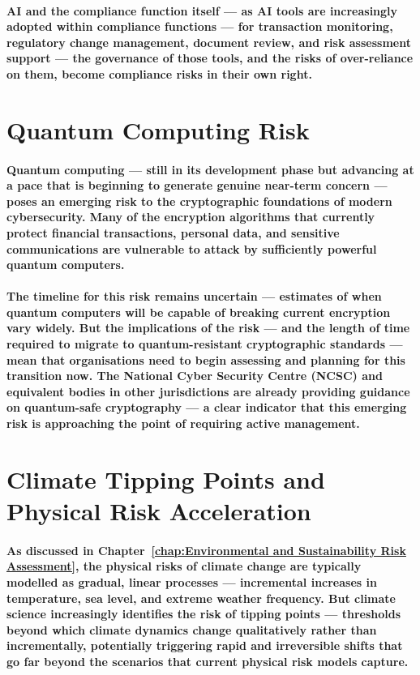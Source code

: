 \paragraph{\textbf{AI and the compliance function itself} — as AI tools are increasingly adopted within compliance functions — for transaction monitoring, regulatory change management, document review, and risk assessment support — the governance of those tools, and the risks of over-reliance on them, become compliance risks in their own right.}

\section{Quantum Computing Risk}
\paragraph{\textbf{Quantum computing} — still in its development phase but advancing at a pace that is beginning to generate genuine near-term concern — poses an emerging risk to the cryptographic foundations of modern cybersecurity. Many of the encryption algorithms that currently protect financial transactions, personal data, and sensitive communications are vulnerable to attack by sufficiently powerful quantum computers.}
\paragraph{The timeline for this risk remains uncertain — estimates of when quantum computers will be capable of breaking current encryption vary widely. But the implications of the risk — and the length of time required to migrate to quantum-resistant cryptographic standards — mean that organisations need to begin assessing and planning for this transition now. The \textbf{National Cyber Security Centre (NCSC)} and equivalent bodies in other jurisdictions are already providing guidance on quantum-safe cryptography — a clear indicator that this emerging risk is approaching the point of requiring active management.}

\section{Climate Tipping Points and Physical Risk Acceleration}
\paragraph{As discussed in Chapter~\ref{chap:Environmental and Sustainability Risk Assessment}, the physical risks of climate change are typically modelled as gradual, linear processes — incremental increases in temperature, sea level, and extreme weather frequency. But climate science increasingly identifies the risk of \textbf{tipping points} — thresholds beyond which climate dynamics change qualitatively rather than incrementally, potentially triggering rapid and irreversible shifts that go far beyond the scenarios that current physical risk models capture.}
